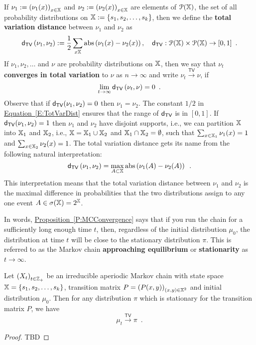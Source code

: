 {\begin{definition}\label{D:TotVarDist}
If $\nu_1:=\left(\nu_1(x)\right)_{x\in \mathbb{X}}$ and $\nu_2 := \left(\nu_2(x)\right)_{x\in \mathbb{X}}$ are elements of $\mathcal{P}(\mathbb{X})$, the set of all probability distributions on $\mathbb{X}:=\{s_1,s_2,\ldots,s_k\}$, then we define the {\bf total variation distance} between $\nu_1$ and $\nu_2$ as
\begin{equation}\label{E:TotVarDist}
\mathsf{d_{TV}} \left( \nu_1, \nu_2 \right) := \frac{1}{2} \sum_{x \mathbb{X}} {\mathop{\rm abs}} \left( \nu_1(x) - \nu_2(x) \right), \quad \mathsf{d_{TV}} : \mathcal{P}(\mathbb{X}) \times \mathcal{P}(\mathbb{X})  \to [0,1] \enspace .
\end{equation}
If $\nu_1, \nu_2, \ldots$ and $\nu$ are probability distributions on $\mathbb{X}$, then we say that $\nu_t$ {\bf converges in total variation} to $\nu$ as $n \to \infty$ and write $\nu_t  \overset{\mathsf{TV}}{\longrightarrow} \nu$, if
\[
\lim_{t \to \infty} \mathsf{d_{TV}} \left( \nu_t, \nu \right) = 0 \enspace .
\]
Observe that if $\mathsf{d_{TV}}(\nu_1,\nu_2)=0$ then $\nu_1=\nu_2$. The constant $1/2$ in \hyperref[E:TotVarDist]{Equation~\ref*{E:TotVarDist}} ensures that the range of $\mathsf{d_{TV}}$ is in $[0,1]$.  If $\mathsf{d_{TV}}(\nu_1,\nu_2)=1$ then $\nu_1$ and $\nu_2$ have disjoint  supports, i.e., we can partition $\mathbb{X}$ into $\mathbb{X}_1$ and $\mathbb{X}_2$, i.e., $\mathbb{X}=\mathbb{X}_1 \cup \mathbb{X}_2$ and $\mathbb{X}_1 \cap \mathbb{X}_2 = \emptyset$, such that $\sum_{x \in \mathbb{X}_1} \nu_1(x)=1$ and  $\sum_{x \in \mathbb{X}_2} \nu_2(x)=1$.  The total variation distance gets its name from the following natural interpretation:
\[
\mathsf{d_{TV}} \left( \nu_1, \nu_2 \right) = \max_{A \subset \mathbb{X}} {\mathop{\rm abs}} \left( \nu_1(A) - \nu_2(A) \right) \enspace .
\]
This interpretation means that the total variation distance between $\nu_1$ and $\nu_2$ is the maximal difference in probabilities that the two distributions assign to any one event $A \in \sigma(\mathbb{X}) = 2^{\mathbb{X}}$. 
\end{definition}

In words, \hyperref[P:MCConvergence]{Proposition~\ref*{P:MCConvergence}} says that if you run the chain for a sufficiently long enough time $t$, then, regardless of the initial distribution $\mu_0$, the distribution at time $t$ will be close to the stationary distribution $\pi$.  This is referred to as the Markov chain {\bf approaching equilibrium} or {\bf stationarity} as $t \to \infty$.  

\begin{prop}\label{P:MCConvergence}
Let $\left( X_t \right)_{t \in \mathbb{Z}_+}$ be an irreducible aperiodic Markov chain with state space $\mathbb{X}=\{s_1,s_2,\ldots,s_k\}$, transition matrix $P = \left( P(x,y) \right)_{(x,y) \in \mathbb{X}^2}$ and initial distribution $\mu_0$.  Then for any distribution $\pi$ which is stationary for the transition matrix $P$, we have
\begin{equation}
\mu_t \overset{\mathsf{TV}}{\longrightarrow} \pi  \enspace .
\end{equation}
\begin{proof}
TBD
\end{proof}
\end{prop}

}
